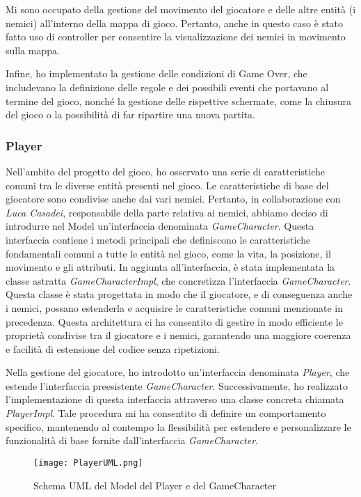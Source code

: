 \documentclass[a4paper,12pt]{report}
\begin{document}
Mi sono occupato della gestione del movimento del giocatore e delle altre entità (i nemici) all'interno della mappa di gioco. Pertanto, anche in questo caso è stato fatto uso di controller per consentire la visualizzazione dei nemici in movimento sulla mappa.

Infine, ho implementato la gestione delle condizioni di Game Over, che includevano la definizione delle regole e dei possibili eventi che portavano al termine del gioco, nonché la gestione delle rispettive schermate, come la chiusura del gioco o la possibilità di far ripartire una nuova partita.

\subsubsection{Player}
Nell'ambito del progetto del gioco, ho osservato una serie di caratteristiche comuni tra le diverse entità presenti nel gioco. Le caratteristiche di base del giocatore sono condivise anche dai vari nemici. 
Pertanto, in collaborazione con \textit{Luca Casadei}, responsabile della parte relativa ai nemici, abbiamo deciso di introdurre nel Model un'interfaccia denominata \textit{GameCharacter}. Questa interfaccia contiene i metodi principali che definiscono le caratteristiche fondamentali comuni a tutte le entità nel gioco, come la vita, la posizione, il movimento e gli attributi.
In aggiunta all'interfaccia, è stata implementata la classe astratta \textit{GameCharacterImpl}, che concretizza l'interfaccia \textit{GameCharacter}. Questa classe è stata progettata in modo che il giocatore, e di conseguenza anche i nemici, possano estenderla e acquisire le caratteristiche comuni menzionate in precedenza. Questa architettura ci ha consentito di gestire in modo efficiente le proprietà condivise tra il giocatore e i nemici, garantendo una maggiore coerenza e facilità di estensione del codice senza ripetizioni.

Nella gestione del giocatore, ho introdotto un'interfaccia denominata \textit{Player}, che estende l'interfaccia preesistente \textit{GameCharacter}. Successivamente, ho realizzato l'implementazione di questa interfaccia attraverso una classe concreta chiamata \textit{PlayerImpl}. Tale procedura mi ha consentito di definire un comportamento specifico, mantenendo al contempo la flessibilità per estendere e personalizzare le funzionalità di base fornite dall'interfaccia \textit{GameCharacter}.

\begin{figure}[H]
	\centering
	\texttt{[image: PlayerUML.png]}
	\caption{Schema UML del Model del Player e del GameCharacter}
	\label{fig:diagramma-classe-player}
\end{figure}
\end{document}
